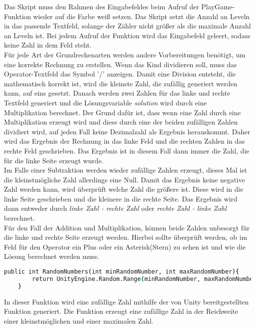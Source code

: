 Das Skript muss den Rahmen des Eingabefeldes beim Aufruf der PlayGame-Funktion wieder auf die Farbe weiß setzen. Das Skript setzt die Anzahl an Leveln in das passende Textfeld, solange der Zähler nicht größer als die maximale Anzahl an Leveln ist. Bei jedem Aufruf der Funktion wird das Eingabefeld geleert, sodass keine Zahl in dem Feld steht.\\
Für jede Art der Grundrechenarten werden andere Vorbereitungen benötigt, um eine korrekte Rechnung zu erstellen. Wenn das Kind dividieren soll, muss das Operator-Textfeld das Symbol '/' anzeigen. Damit eine Division entsteht, die mathematisch korrekt ist, wird die kleinste Zahl, die zufällig generiert werden kann, auf eins gesetzt. Danach werden zwei Zahlen für das linke und rechte Textfeld generiert und die Lösungsvariable \textit{solution} wird durch eine Multiplikation berechnet. Der Grund dafür ist, dass wenn eine Zahl durch eine Multiplikation erzeugt wird und diese durch eine der beiden zufälligen Zahlen dividiert wird, auf jeden Fall keine Dezimalzahl als Ergebnis herauskommt. Daher wird das Ergebnis der Rechnung in das linke Feld und die rechten Zahlen in das rechte Feld geschrieben. Das Ergebnis ist in diesem Fall dann immer die Zahl, die für die linke Seite erzeugt wurde.\\
Im Falle einer Subtraktion werden wieder zufällige Zahlen erzeugt, dieses Mal ist die kleinstmögliche Zahl allerdings eine Null. Damit das Ergebnis keine negative Zahl werden kann, wird überprüft welche Zahl die größere ist. Diese wird in die linke Seite geschrieben und die kleinere in die rechte Seite. Das Ergebnis wird dann entweder durch \textit{linke Zahl - rechte Zahl} oder \textit{rechte Zahl - linke Zahl} berechnet.\\
Für den Fall der Addition und Multiplikation, können beide Zahlen unbesorgt für die linke und rechte Seite erzeugt werden. Hierbei sollte überprüft werden, ob im Feld für den Operator ein Plus oder ein Asterisk(Stern) zu sehen ist und wie die Lösung berechnet werden muss.\\
\begin{lstlisting}[language=csh, caption={MathOperations.cs RandomNumber-Funktion}]
	public int RandomNumbers(int minRandomNumber, int maxRandomNumber){
		return UnityEngine.Random.Range(minRandomNumber, maxRandomNumber);
	}
\end{lstlisting}
In dieser Funktion wird eine zufällige Zahl mithilfe der von Unity bereitgestellten Funktion generiert. Die Funktion erzeugt eine zufällige Zahl in der Reichweite einer kleinstmöglichen und einer maximalen Zahl.\\
